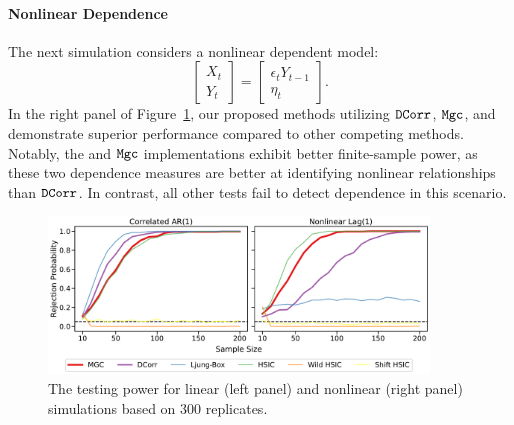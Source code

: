 \paragraph{Nonlinear Dependence}
The next simulation considers a nonlinear dependent model: 
\begin{equation*}
    \begin{bmatrix}
    X_t\\
    Y_t
    \end{bmatrix}
    =
    \begin{bmatrix}
    \epsilon_t Y_{t-1}\\
    \eta_t
    \end{bmatrix}.
\end{equation*}
In the right panel of Figure~\ref{fig:const}, our proposed methods utilizing $\operatorname{\mathtt{DCorr}}${}, $\mathtt{Mgc}${}, and \hsic{} demonstrate superior performance compared to other competing methods. Notably, the \hsic{} and $\mathtt{Mgc}${} implementations exhibit better finite-sample power, as these two dependence measures are better at identifying nonlinear relationships than $\operatorname{\mathtt{DCorr}}${}. In contrast, all other tests fail to detect dependence in this scenario. %

\begin{figure}[ht]
    \centering
    \includegraphics[width=0.9\textwidth]{figures/mgcx/figure2.pdf}
    \caption{The testing power for linear (left panel) and nonlinear (right panel) simulations based on $300$ replicates. } \label{fig:const}
\end{figure}

